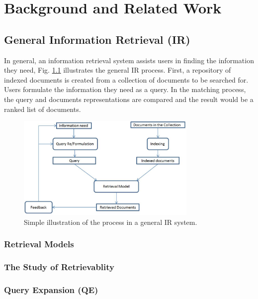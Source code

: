 \chapter{Background and Related Work}
\label{cha:background}


\section{General Information Retrieval (IR)}
In general, an information retrieval system assists users in finding the information they need, Fig. \ref{fig:generalir} illustrates the general IR process. First, a repository of indexed documents is created from a collection of documents to be searched for. Users formulate the information they need as a query. In the matching process, the query and documents representations are compared and the result would be a ranked list of documents.  
\begin{figure}[htpb]
   \centering
   \includegraphics[width=.60\textwidth,height=50mm]{figs/generalIR.jpg}
   \caption{Simple illustration of the process in a general IR system.}  
   \label{fig:generalir} 
\end{figure}
\FloatBarrier 

\subsection{Retrieval Models}
\label{subsub:retmodels}
%


\subsection{The Study of Retrievablity}
%
\label{subsub:retrievability}

\subsection{Query Expansion (QE)}
%


